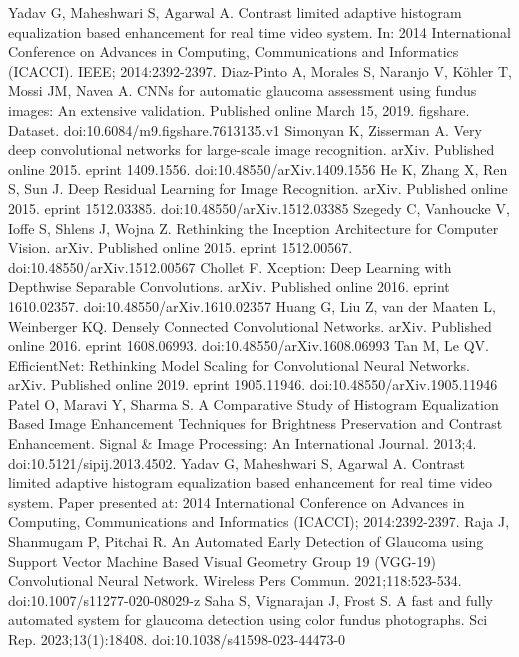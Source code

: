 \documentclass{article}
\begin{document}
\begin{thebibliography}{99.}
 Yadav G, Maheshwari S, Agarwal A. Contrast limited adaptive histogram equalization based enhancement for real time video system. In: 2014 International Conference on Advances in Computing, Communications and Informatics (ICACCI). IEEE; 2014:2392-2397.
 Diaz-Pinto A, Morales S, Naranjo V, Köhler T, Mossi JM, Navea A. CNNs for automatic glaucoma assessment using fundus images: An extensive validation. Published online March 15, 2019. figshare. Dataset. doi:10.6084/m9.figshare.7613135.v1
 Simonyan K, Zisserman A. Very deep convolutional networks for large-scale image recognition. arXiv. Published online 2015. eprint 1409.1556. doi:10.48550/arXiv.1409.1556
 He K, Zhang X, Ren S, Sun J. Deep Residual Learning for Image Recognition. arXiv. Published online 2015. eprint 1512.03385. doi:10.48550/arXiv.1512.03385
 Szegedy C, Vanhoucke V, Ioffe S, Shlens J, Wojna Z. Rethinking the Inception Architecture for Computer Vision. arXiv. Published online 2015. eprint 1512.00567. doi:10.48550/arXiv.1512.00567
 Chollet F. Xception: Deep Learning with Depthwise Separable Convolutions. arXiv. Published online 2016. eprint 1610.02357. doi:10.48550/arXiv.1610.02357
 Huang G, Liu Z, van der Maaten L, Weinberger KQ. Densely Connected Convolutional Networks. arXiv. Published online 2016. eprint 1608.06993. doi:10.48550/arXiv.1608.06993
 Tan M, Le QV. EfficientNet: Rethinking Model Scaling for Convolutional Neural Networks. arXiv. Published online 2019. eprint 1905.11946. doi:10.48550/arXiv.1905.11946 
 Patel O, Maravi Y, Sharma S. A Comparative Study of Histogram Equalization Based Image Enhancement Techniques for Brightness Preservation and Contrast Enhancement. Signal \& Image Processing: An International Journal. 2013;4. doi:10.5121/sipij.2013.4502.
 Yadav G, Maheshwari S, Agarwal A. Contrast limited adaptive histogram equalization based enhancement for real time video system. Paper presented at: 2014 International Conference on Advances in Computing, Communications and Informatics (ICACCI); 2014:2392-2397.
 Raja J, Shanmugam P, Pitchai R. An Automated Early Detection of Glaucoma using Support Vector Machine Based Visual Geometry Group 19 (VGG-19) Convolutional Neural Network. Wireless Pers Commun. 2021;118:523-534. doi:10.1007/s11277-020-08029-z
 Saha S, Vignarajan J, Frost S. A fast and fully automated system for glaucoma detection using color fundus photographs. Sci Rep. 2023;13(1):18408. doi:10.1038/s41598-023-44473-0

\end{thebibliography}
\end{document}
